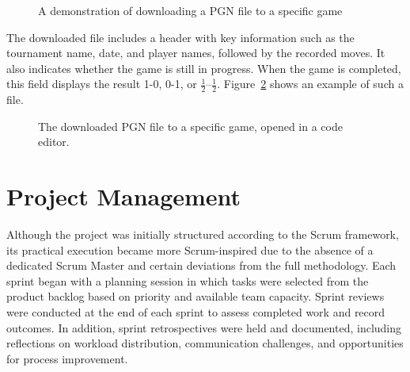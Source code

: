 \begin{figure}[h!] \centering {}\caption[Display of board view]{A demonstration of downloading a PGN file to a specific game}\label{fig:download-pgn} \end{figure}

The downloaded file includes a header with key information such as the tournament name, date, and player names, followed by the recorded moves. It also indicates whether the game is still in progress. When the game is completed, this field displays the result 1-0, 0-1, or $\frac{1}{2}$–$\frac{1}{2}$. Figure~\ref{fig:downloaded-pgn} shows an example of such a file. \\

\begin{figure}[h!] \centering {}\caption[PGN file and metadata]{The downloaded PGN file to a specific game, opened in a code editor.}\label{fig:downloaded-pgn} \end{figure}

\section{Project Management}
\label{sec:results-project-management}
Although the project was initially structured according to the Scrum framework, its practical execution became more Scrum-inspired due to the absence of a dedicated Scrum Master and certain deviations from the full methodology. Each sprint began with a planning session in which tasks were selected from the product backlog based on priority and available team capacity. Sprint reviews were conducted at the end of each sprint to assess completed work and record outcomes. In addition, sprint retrospectives were held and documented, including reflections on workload distribution, communication challenges, and opportunities for process improvement. \\

